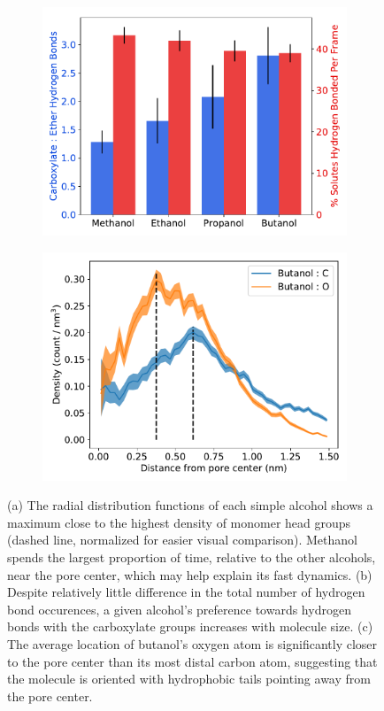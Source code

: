 \documentclass{article}
\begin{document}
\begin{figure}
\begin{subfigure}{0.45\textwidth}
  \includegraphics[width=\linewidth]{simple_alcohol_hbonds.pdf}
  \caption{}\label{fig:simple_alcohol_hbonds}
  \end{subfigure}
  \begin{subfigure}{0.45\textwidth}
  \includegraphics[width=\linewidth]{butanol_CO.pdf}  %
  \caption{}\label{fig:butanol_CO}
  \end{subfigure}
  \caption{(a) The radial distribution functions of each simple alcohol shows a maximum close
  to the highest density of monomer head groups (dashed line, normalized for easier visual
  comparison). Methanol spends the largest proportion of time, relative to the other alcohols,
  near the pore center, which may help explain its fast dynamics. (b) Despite relatively little
  difference in the total number of hydrogen bond occurences, a given alcohol's preference
  towards hydrogen bonds with the carboxylate groups increases with molecule size. (c) The average
  location of butanol's oxygen atom is significantly closer to the pore center than its most distal
  carbon atom, suggesting that the molecule is oriented with hydrophobic tails pointing away from
  the pore center.}\label{fig:simple_alcohols}
  \end{figure}
\end{document}
